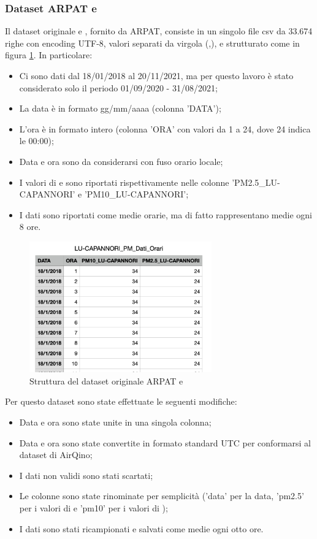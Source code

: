 \subsubsection{Dataset ARPAT  e }
Il dataset originale  e , fornito da ARPAT, consiste in un singolo file csv da 33.674 righe con encoding UTF-8, valori separati da virgola (,), e strutturato come in figura \ref{fig:pm-arpat}. In particolare:
\begin{itemize}
  \item Ci sono dati dal 18/01/2018 al 20/11/2021, ma per questo lavoro è stato considerato solo il periodo 01/09/2020 - 31/08/2021;
  \item La data è in formato gg/mm/aaaa (colonna 'DATA');
  \item L'ora è in formato intero (colonna 'ORA' con valori da 1 a 24, dove 24 indica le 00:00);
  \item Data e ora sono da considerarsi con fuso orario locale;
  \item I valori di  e  sono riportati rispettivamente nelle colonne 'PM2.5\_LU-CAPANNORI' e 'PM10\_LU-CAPANNORI';
  \item I dati sono riportati come medie orarie, ma di fatto rappresentano medie ogni 8 ore.
\end{itemize}

\begin{figure}[H]
\centering
\captionsetup{justification=centering}
\includegraphics[width=0.7\textwidth,height=\textheight,keepaspectratio]{img/dataset_arpat_pm_prima.png}
\caption{Struttura del dataset originale ARPAT  e }
\label{fig:pm-arpat}
\end{figure}

Per questo dataset sono state effettuate le seguenti modifiche:
\begin{itemize}
  \item Data e ora sono state unite in una singola colonna;
  \item Data e ora sono state convertite in formato standard UTC per conformarsi al dataset di AirQino;
  \item I dati non validi sono stati scartati;
  \item Le colonne sono state rinominate per semplicità ('data' per la data, 'pm2.5' per i valori di  e 'pm10' per i valori di );
  \item I dati sono stati ricampionati e salvati come medie ogni otto ore.\\
\end{itemize}

